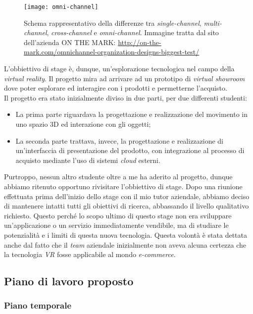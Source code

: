 \label{Omni-channel}
\begin{figure}[ht]
	\begin{center}
		\texttt{[image: omni-channel]}
		\caption{Schema rappresentativo della differenze tra \textit{single-channel}, \textit{multi-channel}, \textit{cross-channel} e \textit{omni-channel}. Immagine tratta dal sito dell'azienda ON THE MARK: \url{http://on-the-mark.com/omnichannel-organization-designs-biggest-test/}}
	\end{center}
\end{figure}
\FloatBarrier

L'obbiettivo di stage è, dunque, un'esplorazione tecnologica nel campo della \textit{virtual reality}. Il progetto mira ad arrivare ad un prototipo di \textit{virtual showroom} dove poter esplorare ed interagire con i prodotti e permetterne l'acquisto. \\
Il progetto era stato inizialmente diviso in due parti, per due differenti studenti:
\begin{itemize}
	\item La prima parte riguardava la progettazione e realizzazione del movimento in uno spazio 3D ed interazione con gli oggetti;
	\item La seconda parte trattava, invece, la progettazione e realizzazione di un'interfaccia di presentazione del prodotto, con integrazione al processo di acquisto mediante l'uso di sistemi \textit{cloud} esterni.
\end{itemize}
Purtroppo, nessun altro studente oltre a me ha aderito al progetto, dunque abbiamo ritenuto opportuno rivisitare l'obbiettivo di stage. Dopo una riunione effettuata prima dell'inizio dello stage con il mio tutor aziendale, abbiamo deciso di mantenere intatti tutti gli obiettivi di ricerca, abbassando il livello qualitativo richiesto. Questo perché lo scopo ultimo di questo stage non era sviluppare un'applicazione o un servizio immediatamente vendibile, ma di studiare le potenzialità e i limiti di questa nuova tecnologia. Questa volontà è stata dettata anche dal fatto che il \textit{team} aziendale inizialmente non aveva alcuna certezza che la tecnologia \textit{VR} fosse applicabile al mondo \textit{e-commerce}.

\subsection{Piano di lavoro proposto}

\subsubsection{Piano temporale}

